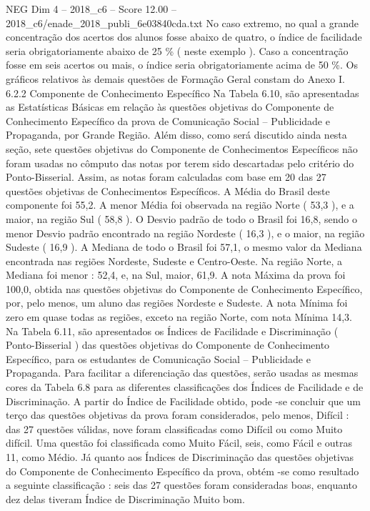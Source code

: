 \begin{textsample}{NEG Dim 4 – 2018\_c6 – Score 12.00 – 2018\_c6/enade\_2018\_publi\_6e03840cda.txt}
No caso extremo, no qual a grande concentração dos acertos dos alunos fosse abaixo de quatro, o índice de facilidade seria obrigatoriamente abaixo de 25 \% ( neste exemplo ).
Caso a concentração fosse em seis acertos ou mais, o índice seria obrigatoriamente acima de 50 \%.
Os gráficos relativos às demais questões de Formação Geral constam do Anexo I. 6.2.2 Componente de Conhecimento Específico Na Tabela 6.10, são apresentadas as Estatísticas Básicas em relação às questões objetivas do Componente de Conhecimento Específico da prova de Comunicação Social – Publicidade e Propaganda, por Grande Região.
Além disso, como será discutido ainda nesta seção, sete questões objetivas do Componente de Conhecimentos Específicos não foram usadas no cômputo das notas por terem sido descartadas pelo critério do Ponto-Bisserial.
Assim, as notas foram calculadas com base em 20 das 27 questões objetivas de Conhecimentos Específicos.
A Média do Brasil deste componente foi 55,2.
A menor Média foi observada na região Norte ( 53,3 ), e a maior, na região Sul ( 58,8 ).
O Desvio padrão de todo o Brasil foi 16,8, sendo o menor Desvio padrão encontrado na região Nordeste ( 16,3 ), e o maior, na região Sudeste ( 16,9 ).
A Mediana de todo o Brasil foi 57,1, o mesmo valor da Mediana encontrada nas regiões Nordeste, Sudeste e Centro-Oeste.
Na região Norte, a Mediana foi menor : 52,4, e, na Sul, maior, 61,9.
A nota Máxima da prova foi 100,0, obtida nas questões objetivas do Componente de Conhecimento Específico, por, pelo menos, um aluno das regiões Nordeste e Sudeste.
A nota Mínima foi zero em quase todas as regiões, exceto na região Norte, com nota Mínima 14,3.
Na Tabela 6.11, são apresentados os Índices de Facilidade e Discriminação ( Ponto-Bisserial ) das questões objetivas do Componente de Conhecimento Específico, para os estudantes de Comunicação Social – Publicidade e Propaganda.
Para facilitar a diferenciação das questões, serão usadas as mesmas cores da Tabela 6.8 para as diferentes classificações dos Índices de Facilidade e de Discriminação.
A partir do Índice de Facilidade obtido, pode -se concluir que um terço das questões objetivas da prova foram considerados, pelo menos, Difícil : das 27 questões válidas, nove foram classificadas como Difícil ou como Muito difícil.
Uma questão foi classificada como Muito Fácil, seis, como Fácil e outras 11, como Médio.
Já quanto aos Índices de Discriminação das questões objetivas do Componente de Conhecimento Específico da prova, obtém -se como resultado a seguinte classificação : seis das 27 questões foram consideradas boas, enquanto dez delas tiveram Índice de Discriminação Muito bom.

\end{textsample}
